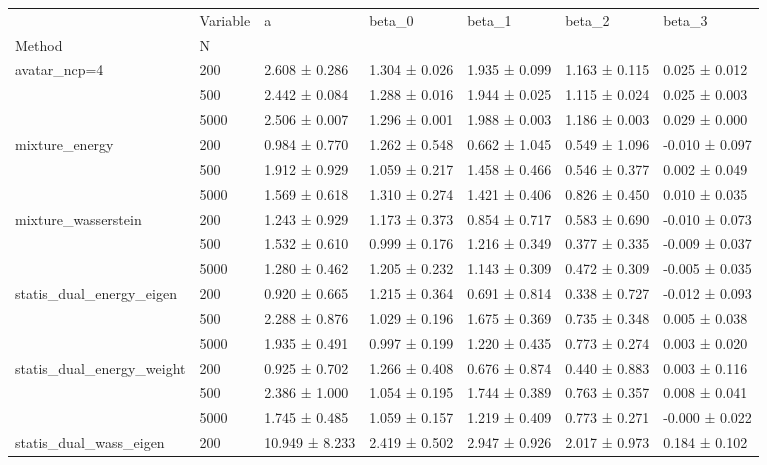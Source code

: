 \begin{tabular}{lllllll}
\toprule
 & Variable & a & beta_0 & beta_1 & beta_2 & beta_3 \\
Method & N &  &  &  &  &  \\
\midrule
\multirow[t]{3}{*}{avatar_ncp=4} & 200 & 2.608 ± 0.286 & 1.304 ± 0.026 & 1.935 ± 0.099 & 1.163 ± 0.115 & 0.025 ± 0.012 \\
 & 500 & 2.442 ± 0.084 & 1.288 ± 0.016 & 1.944 ± 0.025 & 1.115 ± 0.024 & 0.025 ± 0.003 \\
 & 5000 & 2.506 ± 0.007 & 1.296 ± 0.001 & 1.988 ± 0.003 & 1.186 ± 0.003 & 0.029 ± 0.000 \\
\cline{1-7}
\multirow[t]{3}{*}{mixture_energy} & 200 & 0.984 ± 0.770 & 1.262 ± 0.548 & 0.662 ± 1.045 & 0.549 ± 1.096 & -0.010 ± 0.097 \\
 & 500 & 1.912 ± 0.929 & 1.059 ± 0.217 & 1.458 ± 0.466 & 0.546 ± 0.377 & 0.002 ± 0.049 \\
 & 5000 & 1.569 ± 0.618 & 1.310 ± 0.274 & 1.421 ± 0.406 & 0.826 ± 0.450 & 0.010 ± 0.035 \\
\cline{1-7}
\multirow[t]{3}{*}{mixture_wasserstein} & 200 & 1.243 ± 0.929 & 1.173 ± 0.373 & 0.854 ± 0.717 & 0.583 ± 0.690 & -0.010 ± 0.073 \\
 & 500 & 1.532 ± 0.610 & 0.999 ± 0.176 & 1.216 ± 0.349 & 0.377 ± 0.335 & -0.009 ± 0.037 \\
 & 5000 & 1.280 ± 0.462 & 1.205 ± 0.232 & 1.143 ± 0.309 & 0.472 ± 0.309 & -0.005 ± 0.035 \\
\cline{1-7}
\multirow[t]{3}{*}{statis_dual_energy_eigen} & 200 & 0.920 ± 0.665 & 1.215 ± 0.364 & 0.691 ± 0.814 & 0.338 ± 0.727 & -0.012 ± 0.093 \\
 & 500 & 2.288 ± 0.876 & 1.029 ± 0.196 & 1.675 ± 0.369 & 0.735 ± 0.348 & 0.005 ± 0.038 \\
 & 5000 & 1.935 ± 0.491 & 0.997 ± 0.199 & 1.220 ± 0.435 & 0.773 ± 0.274 & 0.003 ± 0.020 \\
\cline{1-7}
\multirow[t]{3}{*}{statis_dual_energy_weight} & 200 & 0.925 ± 0.702 & 1.266 ± 0.408 & 0.676 ± 0.874 & 0.440 ± 0.883 & 0.003 ± 0.116 \\
 & 500 & 2.386 ± 1.000 & 1.054 ± 0.195 & 1.744 ± 0.389 & 0.763 ± 0.357 & 0.008 ± 0.041 \\
 & 5000 & 1.745 ± 0.485 & 1.059 ± 0.157 & 1.219 ± 0.409 & 0.773 ± 0.271 & -0.000 ± 0.022 \\
\cline{1-7}
\multirow[t]{3}{*}{statis_dual_wass_eigen} & 200 & 10.949 ± 8.233 & 2.419 ± 0.502 & 2.947 ± 0.926 & 2.017 ± 0.973 & 0.184 ± 0.102 \\

\end{tabular}
